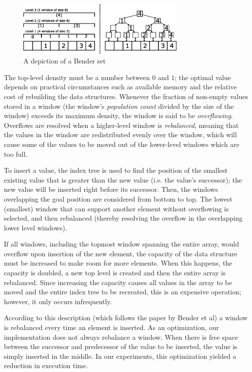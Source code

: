 \documentclass{acm_proc_article-sp}
\begin{document}
\begin{figure}
\centering
\includegraphics[width=83mm]{bender-set}
\caption{A depiction of a Bender set}
\label{fig-bender-set}
\end{figure}


The top-level density must be a number between $0$ and $1$; the optimal value
depends on practical circumstances such as available memory and the relative
cost of rebuilding the data structures.
Whenever the fraction of non-empty values stored in a window (the window's
\emph{population count} divided by the size of the window) exceeds its maximum
density, the window is said to be \emph{overflowing}.
Overflows are resolved when a higher-level window is \emph{rebalanced},
meaning that the values in the window are redistributed evenly over the window,
which will cause some of the values to be moved out of the lower-level windows
which are too full.

To insert a value, the index tree is used to find the position of the smallest
existing value that is greater than the new value (i.e. the value's successor);
the new value will be inserted right before its successor.
Then, the windows overlapping the goal position are considered from bottom to
top. The lowest (smallest) window that can support another element without
overflowing is selected, and then rebalanced (thereby resolving the overflow in
the overlapping lower level windows).

If all windows, including the topmost window spanning the entire array,
would overflow upon insertion of the new element, the capacity of the data
structure must be increased to make room for more elements.
When this happens, the capacity is doubled, a new top level is
created and then the entire array is rebalanced.
Since increasing the capacity causes all values in the array to be moved
and the entire index tree to be recreated, this is an expensive operation;
however, it only occurs infrequently.

According to this description (which follows the paper by Bender et al) a window
is rebalanced every time an element is inserted. As an optimization, our
implementation does not always rebalance a window. When there is free space
between the successor and predecessor of the value to be inserted, the value
is simply inserted in the middle. In our experiments, this optimization
yielded a reduction in execution time.
\end{document}
